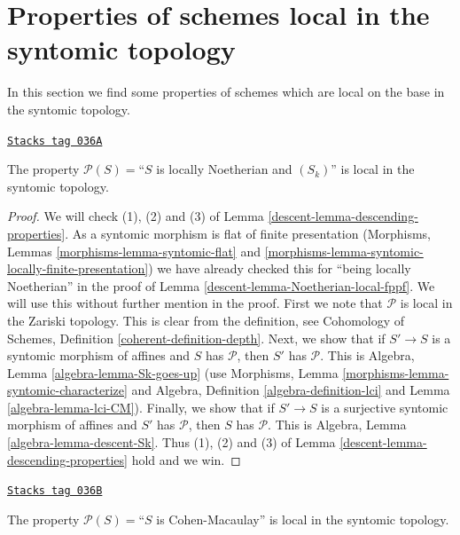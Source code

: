 \section{Properties of schemes local in the syntomic topology}
\label{descent-section-descending-properties-syntomic}
In this section we find some properties of schemes which are local on the base
in the syntomic topology.

\begin{lemma}
\label{descent-lemma-Sk-local-syntomic}
\href{https://stacks.math.columbia.edu/tag/036A}{\texttt{Stacks tag 036A}}

The property $\mathcal{P}(S) =$``$S$ is locally Noetherian and $(S_k)$''
is local in the syntomic topology.
\end{lemma}

\begin{proof}

We will check (1), (2) and (3) of Lemma \ref{descent-lemma-descending-properties}.
As a syntomic morphism is flat of finite presentation
(Morphisms, Lemmas \ref{morphisms-lemma-syntomic-flat}
and \ref{morphisms-lemma-syntomic-locally-finite-presentation})
we have already checked this for ``being locally Noetherian'' in the proof
of Lemma \ref{descent-lemma-Noetherian-local-fppf}.
We will use this without further mention in the proof.
First we note that $\mathcal{P}$ is local in the Zariski topology.
This is clear from the definition,
see Cohomology of Schemes, Definition \ref{coherent-definition-depth}.
Next, we show that if $S' \to S$ is a syntomic morphism of affines
and $S$ has $\mathcal{P}$, then $S'$ has $\mathcal{P}$. This
is Algebra, Lemma \ref{algebra-lemma-Sk-goes-up}
(use
Morphisms, Lemma \ref{morphisms-lemma-syntomic-characterize}
and
Algebra, Definition \ref{algebra-definition-lci} and
Lemma \ref{algebra-lemma-lci-CM}).
Finally, we show that if $S' \to S$ is a surjective
syntomic morphism of affines and $S'$ has $\mathcal{P}$,
then $S$ has $\mathcal{P}$. This is
Algebra, Lemma \ref{algebra-lemma-descent-Sk}.
Thus (1), (2) and (3) of Lemma \ref{descent-lemma-descending-properties} hold
and we win.
\end{proof}

\begin{lemma}
\label{descent-lemma-CM-local-syntomic}
\href{https://stacks.math.columbia.edu/tag/036B}{\texttt{Stacks tag 036B}}

The property $\mathcal{P}(S) =$``$S$ is Cohen-Macaulay''
is local in the syntomic topology.
\end{lemma}

